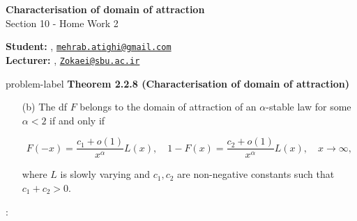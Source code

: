	






		\begin{Large}
		\textsf{\textbf{Characterisation of domain of attraction}}\\
		Section 10 - Home Work 2
	\end{Large}
	
	\vspace{1ex}
	
	\textsf{\textbf{Student:}} , \href{mailto:mehrab.atighi@gmail.com}{\texttt{mehrab.atighi@gmail.com}}\\
	\textsf{\textbf{Lecturer:}} , \href{mailto:Zokaei@sbu.ac.ir}{\texttt{Zokaei@sbu.ac.ir}}
	
	
	\vspace{2ex}
	
	\begin{problem}{}{problem-label}
			\textbf{Theorem 2.2.8 (Characterisation of domain of attraction)}
		
		\begin{itemize}
			\item[(b)] The df \( F \) belongs to the domain of attraction of an \(\alpha\)-stable law for some \(\alpha < 2\) if and only if
			
			
			\[
			F(-x) = \frac{c_1 + o(1)}{x^\alpha} L(x), \quad 1 - F(x) = \frac{c_2 + o(1)}{x^\alpha} L(x), \quad x \to \infty,
			\]
			
			
			where \( L \) is slowly varying and \( c_1, c_2 \) are non-negative constants such that \( c_1 + c_2 > 0 \).
		\end{itemize}
		\cite{Embrechts.etal1997}:
	\end{problem}
	
